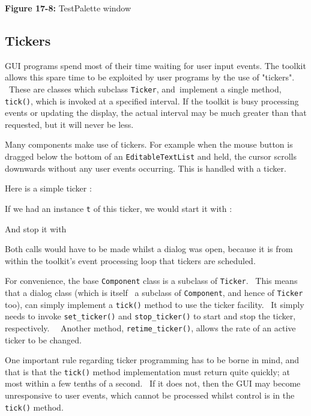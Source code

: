 {\sffamily\bfseries Figure 17-8:}
{\sffamily TestPalette window}

\subsection{Tickers}

GUI programs spend most of their time waiting for user input
events. The toolkit allows this spare time to be exploited by user
programs by the use of "tickers". \ These
are classes which subclass \texttt{Ticker}, and\texttt{ }implement a
single method, \texttt{tick()}, which is invoked at a specified
interval. If the toolkit is busy processing events or
updating the display, the actual interval may be much greater than that
requested, but it will never be less.

Many components make use of tickers. For example when the mouse button
is dragged below the bottom of an \texttt{EditableTextList} and held,
the cursor scrolls downwards without any user events occurring. This
is handled with a ticker.

Here is a simple ticker :


If we had an instance \texttt{t} of this ticker, we would start it with
:


And stop it with


Both calls would have to be made whilst a dialog was open, because it is
from within the toolkit's event processing loop that
tickers are scheduled.

For convenience, the base \texttt{Component} class is a subclass of
\texttt{Ticker}. \ This means that a dialog class (which is itself \ a
subclass of \texttt{Component}, and hence of \texttt{Ticker} too), can
simply implement a \texttt{tick()} method to use the ticker facility.
\ It simply needs to invoke \texttt{set\_ticker()} and
\texttt{stop\_ticker()} to start and stop the ticker, respectively.
\ \ Another method, \texttt{retime\_ticker()}, allows the rate of an
active ticker to be changed.

One important rule regarding ticker programming has to be borne in mind,
and that is that the \texttt{tick()} method implementation must return
quite quickly; at most within a few tenths of a second. \ If it does
not, then the GUI may become unresponsive to user events, which cannot
be processed whilst control is in the \texttt{tick()} method.

